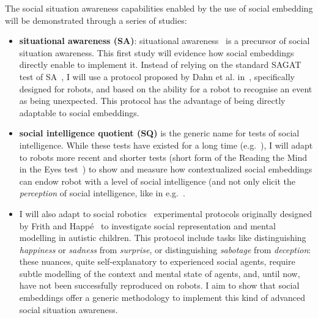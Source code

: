 The social situation awareness capabilities enabled by the use of social embedding will be
demonstrated through a series of studies:

\begin{itemize}
    \item {\bf situational awareness (SA)}: situational
        awareness~\cite{endsley1995theory} is a precursor of social situation
        awareness. This first study will evidence how social embeddings directly
        enable to implement it. Instead of relying on the standard SAGAT test of
        SA~\cite{endsley2017direct}, I will use a protocol proposed by Dahn et
        al. in~\cite{dahn2018situation}, specifically designed for robots, and
        based on the ability for a robot to recognise an event as being
        unexpected. This protocol has the advantage of being directly adaptable
        to social embeddings.

    \item {\bf social intelligence quotient (SQ)} is the generic name for tests
        of social intelligence. While these tests have existed for a long time
        (e.g.~\cite{moss1930social}), I will adapt to robots more recent and shorter tests
        (short form of the Reading the Mind in the Eyes
        test~\cite{olderbak2015psychometric}) to show and measure how contextualized social
        embeddings can endow robot with a level of social intelligence (and not
        only elicit the \emph{perception} of social intelligence, like in
        e.g.~\cite{barchard2020measuring}.

    \item I will also adapt to social robotics~\cite{lemaignan2015mutual}
        experimental protocols originally designed by Frith and
        Happé~\cite{frith1994autism} to investigate social representation and
        mental modelling in autistic children.  This protocol include tasks like
        distinguishing \emph{happiness} or \emph{sadness} from \emph{surprise},
        or distinguishing \emph{sabotage} from \emph{deception}: these nuances,
        quite self-explanatory to experienced social agents, require subtle
        modelling of the context and mental state of agents, and, until now,
        have not been successfully reproduced on robots. I aim to show that
        social embeddings offer a generic methodology to implement this kind of
        advanced social situation awareness.

\end{itemize}

